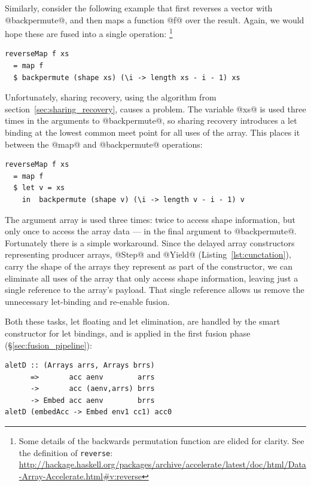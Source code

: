 Similarly, consider the following example that first reverses a vector with
@backpermute@, and then maps a function @f@ over the result. Again, we
would hope these are fused into a single operation:%
\footnote{Some details of the backwards permutation function are elided for
clarity. See the definition of \texttt{reverse}:
\url{http://hackage.haskell.org/packages/archive/accelerate/latest/doc/html/Data-Array-Accelerate.html\#v:reverse}}
%
\begin{lstlisting}[style=haskell]
reverseMap f xs
  = map f
  $ backpermute (shape xs) (\i -> length xs - i - 1) xs
\end{lstlisting}
%
Unfortunately, sharing recovery, using the algorithm from
section~\ref{sec:sharing_recovery}, causes a problem. The variable @xs@
is used three times in the arguments to @backpermute@, so sharing recovery
introduces a let binding at the lowest common meet point for all uses of the
array. This places it between the @map@ and @backpermute@ operations:
%
\begin{lstlisting}[style=haskell]
reverseMap f xs
  = map f
  $ let v = xs
    in  backpermute (shape v) (\i -> length v - i - 1) v
\end{lstlisting}
%
The argument array is used three times: twice to access shape information, but
only once to access the array data --- in the final argument to
@backpermute@. Fortunately there is a simple workaround. Since the delayed
array constructors representing producer arrays, @Step@ and @Yield@
(Listing~\ref{lst:cunctation}), carry the shape of the arrays they represent as
part of the constructor, we can eliminate all uses of the array that only access
shape information, leaving just a single reference to the array's payload.
That single reference allows us remove the unnecessary let-binding and re-enable
fusion.

Both these tasks, let floating and let elimination, are handled by the smart
constructor for let bindings, and is applied in the first fusion phase
(\S\ref{sec:fusion_pipeline}):
%
\begin{lstlisting}[style=haskell
    ,name=aletD
    ,label=lst:aletD
    ,caption={[Fusion rule for let bindings]}]
aletD :: (Arrays arrs, Arrays brrs)
      =>       acc aenv        arrs
      ->       acc (aenv,arrs) brrs
      -> Embed acc aenv        brrs
aletD (embedAcc -> Embed env1 cc1) acc0
\end{lstlisting}

